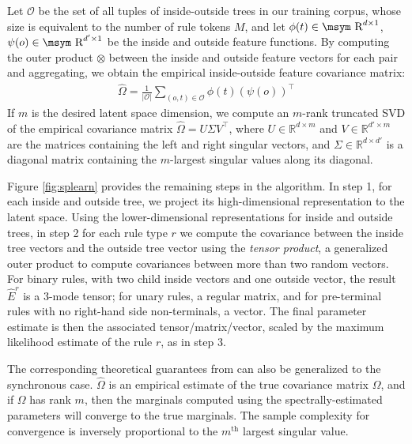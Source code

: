 \documentclass[11pt]{article}
\newcommand{\e}[1]{\hat{#1}}
\newcommand{\reals}{\mbox{\msym R}}
\begin{document}
Let $\mathcal{O}$ be the set of all tuples of inside-outside trees in our training corpus, whose size is equivalent to the number of rule tokens $M$, and let $\phi(t) \in \reals^{d \times 1}$, $\psi(o) \in \reals^{d' \times 1}$ be the inside and outside feature functions. 
By computing the outer product $\otimes$ between the inside and outside feature vectors for each pair and aggregating, we obtain the empirical inside-outside feature covariance matrix:
\begin{align}
	\hat{\Omega} = \frac{1}{|\mathcal{O}|} \sum_{(o,t) \in \mathcal{O}} \phi(t) \left(\psi(o)\right)^{\top}
	\label{eq:outerproduct}
\end{align}
If $m$ is the desired latent space dimension, we compute an $m$-rank truncated SVD of the empirical covariance matrix $\hat{\Omega} = U \Sigma V^{\top}$, where $U \in \mathbb{R}^{d \times m}$ and $V \in \mathbb{R}^{d' \times m}$ are the matrices containing the left and right singular vectors, and $\Sigma \in \mathbb{R}^{d \times d'}$ is a diagonal matrix containing the $m$-largest singular values along its diagonal.  

Figure \ref{fig:splearn} provides the remaining steps in the algorithm.  
In step 1, for each inside and outside tree, we project its high-dimensional representation to the latent space.  
Using the lower-dimensional representations for inside and outside trees, in step 2 for each rule type $r$ we compute the covariance between the inside tree vectors and the outside tree vector using the \emph{tensor product}, a generalized outer product to compute covariances between more than two random vectors.  
For binary rules, with two child inside vectors and one outside vector, the result $\e{E}^r$ is a 3-mode tensor; for unary rules, a regular matrix, and for pre-terminal rules with no right-hand side non-terminals, a vector. 
The final parameter estimate is then the associated tensor/matrix/vector, scaled by the maximum likelihood estimate of the rule $r$, as in step 3.  

The corresponding theoretical guarantees from  can also be generalized to the synchronous case.  
$\hat{\Omega}$ is an empirical estimate of the true covariance matrix $\Omega$, and if $\Omega$ has rank $m$, then the marginals computed using the spectrally-estimated parameters will converge to the true marginals.  
The sample complexity for convergence is inversely proportional to the $m^{\textrm{th}}$ largest singular value.   
\end{document}
